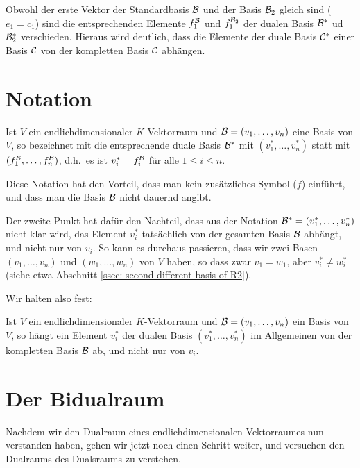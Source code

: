 \documentclass[a4paper,10pt]{article}
\begin{document}
Obwohl der erste Vektor der Standardbasis $\mathcal{B}$ und der Basis $\mathcal{B}_2$ gleich sind ($e_1 = c_1$) sind die entsprechenden Elemente $f^{\mathcal{B}}_1$ und $f^{\mathcal{B}_2}_1$ der dualen Basis $\mathcal{B}^*$ ud $\mathcal{B}_2^*$ verschieden. Hieraus wird deutlich, dass die Elemente der duale Basis $\mathcal{C}^*$ einer Basis $\mathcal{C}$ von der kompletten Basis $\mathcal{C}$ abhängen.










\section{Notation}
Ist $V$ ein endlichdimensionaler $K$-Vektorraum und $\mathcal{B} = (v_1, \dotsc, v_n)$ eine Basis von $V$, so bezeichnet mit die entsprechende duale Basis $\mathcal{B}^*$ mit $(v_1^*, \dotsc, v_n^*)$ statt mit $(f^{\mathcal{B}}_1, \dotsc, f^{\mathcal{B}}_n)$, d.h.\ es ist $v_i^* = f^{\mathcal{B}}_i$ für alle $1 \leq i \leq n$.

Diese Notation hat den Vorteil, dass man kein zusätzliches Symbol ($f$) einführt, und dass man die Basis $\mathcal{B}$ nicht dauernd angibt.

Der zweite Punkt hat dafür den Nachteil, dass aus der Notation $\mathcal{B}^* = (v_1^*, \dotsc, v_n^*)$ nicht klar wird, das Element $v_i^*$ tatsächlich von der gesamten Basis $\mathcal{B}$ abhängt, und nicht nur von $v_i$. So kann es durchaus passieren, dass wir zwei Basen $(v_1, \dotsc, v_n)$ und $(w_1, \dotsc, w_n)$ von $V$ haben, so dass zwar $v_1 = w_1$, aber $v_i^* \neq w_i^*$ (siehe etwa Abschnitt \ref{ssec: second different basis of R2}).

Wir halten also fest:

\begin{shaded}
 Ist $V$ ein endlichdimensionaler $K$-Vektorraum und $\mathcal{B} = (v_1, \dotsc, v_n)$ ein Basis von $V$, so hängt ein Element $v_i^*$ der dualen Basis $(v_1^*, \dotsc, v_n^*)$ im Allgemeinen von der kompletten Basis $\mathcal{B}$ ab, und nicht nur von $v_i$.
\end{shaded}










\section{Der Bidualraum}
Nachdem wir den Dualraum eines endlichdimensionalen Vektorraumes nun verstanden haben, gehen wir jetzt noch einen Schritt weiter, und versuchen den Dualraums des Dualsraums zu verstehen.
\end{document}
